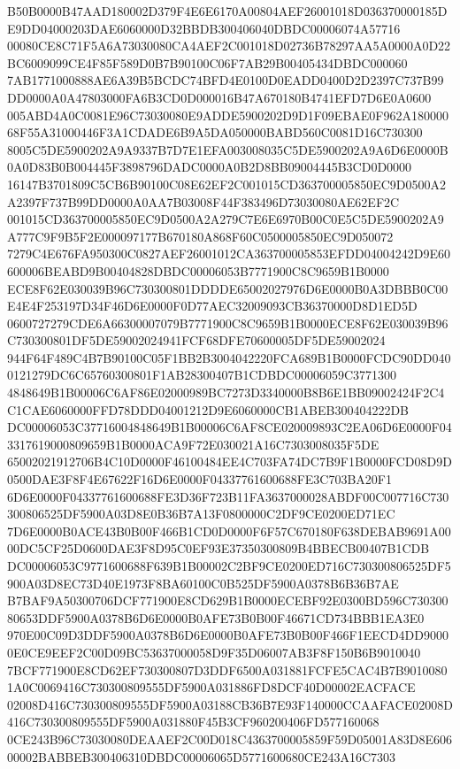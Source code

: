 \documentclass[UTF8,fontset=fandol,zihao=-4,a4paper]{ctexart}
\begin{document}
{{B50B0000B47AAD180002D379F4E6E6170A00804AEF26001018D036370000185DE9DD04000203DAE6060000D32BBDB300406040DBDC00006074A57716
00080CE8C71F5A6A73030080CA4AEF2C001018D02736B78297AA5A0000A0D22BC6009099CE4F85F589D0B7B90100C06F7AB29B00405434DBDC000060
7AB1771000888AE6A39B5BCDC74BFD4E0100D0EADD0400D2D2397C737B99DD0000A0A47803000FA6B3CD0D000016B47A670180B4741EFD7D6E0A0600
005ABD4A0C0081E96C73030080E9ADDE5900202D9D1F09EBAE0F962A18000068F55A31000446F3A1CDADE6B9A5DA050000BABD560C0081D16C730300
8005C5DE5900202A9A9337B7D7E1EFA003008035C5DE5900202A9A6D6E0000B0A0D83B0B004445F3898796DADC0000A0B2D8BB09004445B3CD0D0000
16147B3701809C5CB6B90100C08E62EF2C001015CD363700005850EC9D0500A2A2397F737B99DD0000A0AA7B03008F44F383496D73030080AE62EF2C
001015CD363700005850EC9D0500A2A279C7E6E6970B00C0E5C5DE5900202A9A777C9F9B5F2E000097177B670180A868F60C0500005850EC9D050072
7279C4E676FA950300C0827AEF26001012CA363700005853EFDD04004242D9E60600006BEABD9B00404828DBDC00006053B7771900C8C9659B1B0000
ECE8F62E030039B96C730300801DDDDE65002027976D6E0000B0A3DBBB0C00E4E4F253197D34F46D6E0000F0D77AEC32009093CB36370000D8D1ED5D
0600727279CDE6A66300007079B7771900C8C9659B1B0000ECE8F62E030039B96C730300801DF5DE59002024941FCF68DFE70600005DF5DE59002024
944F64F489C4B7B90100C05F1BB2B3004042220FCA689B1B0000FCDC90DD0400121279DC6C65760300801F1AB28300407B1CDBDC00006059C3771300
4848649B1B00006C6AF86E02000989BC7273D3340000B8B6E1BB09002424F2C4C1CAE6060000FFD78DDD04001212D9E6060000CB1ABEB300404222DB
DC00006053C37716004848649B1B00006C6AF8CE020009893C2EA06D6E0000F043317619000809659B1B0000ACA9F72E030021A16C7303008035F5DE
65002021912706B4C10D0000F46100484EE4C703FA74DC7B9F1B0000FCD08D9D0500DAE3F8F4E67622F16D6E0000F04337761600688FE3C703BA20F1
6D6E0000F04337761600688FE3D36F723B11FA3637000028ABDF00C007716C730300806525DF5900A03D8E0B36B7A13F0800000C2DF9CE0200ED71EC
7D6E0000B0ACE43B0B00F466B1CD0D0000F6F57C670180F638DEBAB9691A0000DC5CF25D0600DAE3F8D95C0EF93E37350300809B4BBECB00407B1CDB
DC00006053C9771600688F639B1B00002C2BF9CE0200ED716C730300806525DF5900A03D8EC73D40E1973F8BA60100C0B525DF5900A0378B6B36B7AE
B7BAF9A50300706DCF771900E8CD629B1B0000ECEBF92E0300BD596C73030080653DDF5900A0378B6D6E0000B0AFE73B0B00F46671CD734BBB1EA3E0
970E00C09D3DDF5900A0378B6D6E0000B0AFE73B0B00F466F1EECD4DD90000E0CE9EEF2C00D09BC53637000058D9F35D06007AB3F8F150B6B9010040
7BCF771900E8CD62EF730300807D3DDF6500A031881FCFE5CAC4B7B90100801A0C0069416C730300809555DF5900A031886FD8DCF40D00002EACFACE
02008D416C730300809555DF5900A03188CB36B7E93F140000CCAAFACE02008D416C730300809555DF5900A031880F45B3CF960200406FD577160068
0CE243B96C73030080DEAAEF2C00D018C4363700005859F59D05001A83D8E60600002BABBEB300406310DBDC00006065D5771600680CE243A16C7303
}}
\end{document}
